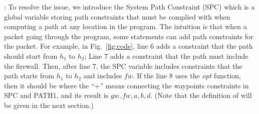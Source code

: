 : To resolve the issue, we introduce the System Path Constraint (SPC) which is a global variable storing path constraints that must be complied with when computing a path at any location in the program. The intuition is that when a packet going through the program, some statements can add path constraints for the packet. For example, in Fig.~\ref{fig:code}, line 6 adds a constraint that the path should start from $h_1$ to $h_2$; Line 7 adds a constraint that the path must include the firewall. Then, after line 7, the SPC variable includes constraints that the path starts from $h_1$ to $h_2$ and includes $fw$. If the line 8 uses the \emph{opt} function, then it should be  where the ``+'' means connecting the waypoints constraints in SPC and PATH1, and its result is $gw, fw, a, b, d$. (Note that the definition of  will be given in the next section.)


%
%

